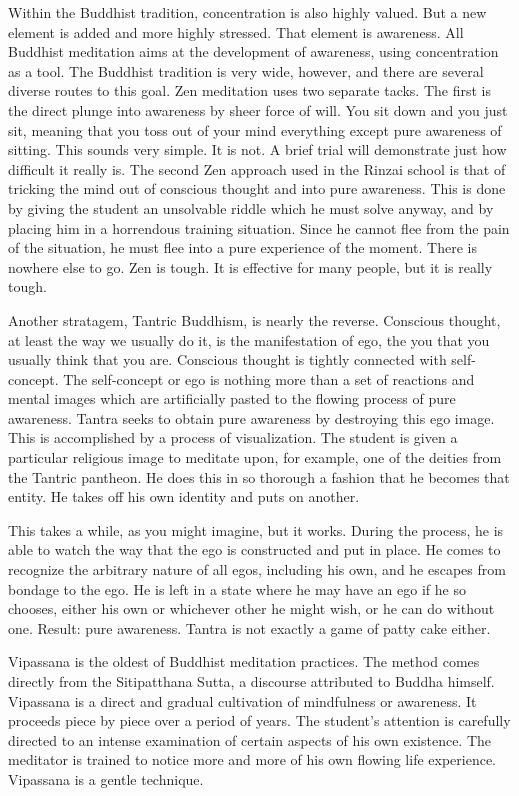 Within the Buddhist tradition, concentration is also highly valued. But a new
element is added and more highly stressed. That element is awareness. All
Buddhist meditation aims at the development of awareness, using concentration as
a tool. The Buddhist tradition is very wide, however, and there are several
diverse routes to this goal. Zen meditation uses two separate tacks. The first
is the direct plunge into awareness by sheer force of will. You sit down and you
just sit, meaning that you toss out of your mind everything except pure
awareness of sitting. This sounds very simple. It is not. A brief trial will
demonstrate just how difficult it really is. The second Zen approach used in the
Rinzai school is that of tricking the mind out of conscious thought and into
pure awareness. This is done by giving the student an unsolvable riddle which he
must solve anyway, and by placing him in a horrendous training situation. Since
he cannot flee from the pain of the situation, he must flee into a pure
experience of the moment. There is nowhere else to go. Zen is tough. It is
effective for many people, but it is really tough.

Another stratagem, Tantric Buddhism, is nearly the reverse. Conscious thought,
at least the way we usually do it, is the manifestation of ego, the you that you
usually think that you are. Conscious thought is tightly connected with
self-concept. The self-concept or ego is nothing more than a set of reactions
and mental images which are artificially pasted to the flowing process of pure
awareness. Tantra seeks to obtain pure awareness by destroying this ego image.
This is accomplished by a process of visualization. The student is given a
particular religious image to meditate upon, for example, one of the deities
from the Tantric pantheon. He does this in so thorough a fashion that he becomes
that entity. He takes off his own identity and puts on another.

This takes a while, as you might imagine, but it works. During the process, he
is able to watch the way that the ego is constructed and put in place. He comes
to recognize the arbitrary nature of all egos, including his own, and he escapes
from bondage to the ego. He is left in a state where he may have an ego if he so
chooses, either his own or whichever other he might wish, or he can do without
one. Result: pure awareness. Tantra is not exactly a game of patty cake either.

Vipassana is the oldest of Buddhist meditation practices. The method comes
directly from the Sitipatthana Sutta, a discourse attributed to Buddha himself.
Vipassana is a direct and gradual cultivation of mindfulness or awareness. It
proceeds piece by piece over a period of years. The student's attention is
carefully directed to an intense examination of certain aspects of his own
existence. The meditator is trained to notice more and more of his own flowing
life experience. Vipassana is a gentle technique.

